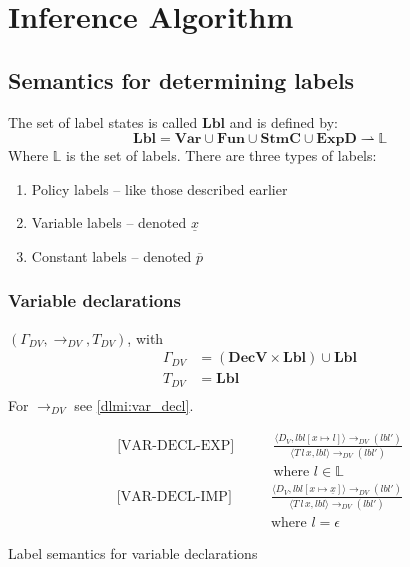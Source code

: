 
\newcommand{\iVar}{\mathbf{Var}}
\newcommand{\iFun}{\mathbf{Fun}}
\newcommand{\iDecv}{\mathbf{DecV}}
\newcommand{\iDecf}{\mathbf{DecF}}
\newcommand{\iStmc}{\mathbf{StmC}}
\newcommand{\iExpd}{\mathbf{ExpD}}
\newcommand{\iLbl}{\mathbf{Lbl}}

\newcommand{\trtspc}{\hspace{2em}} %

\section{Inference Algorithm}

\subsection{Semantics for determining labels}
The set of label states is called $\iLbl$ and is defined by:
\[
  \iLbl = \iVar \cup \iFun \cup \iStmc \cup \iExpd \rightharpoonup \mathbb{L}
\]
Where $\mathbb{L}$ is the set of labels.
There are three types of labels:
\begin{enumerate}
  \item Policy labels -- like those described earlier
  \item Variable labels -- denoted $\underline{x}$
  \item Constant labels -- denoted $\overline{p}$
\end{enumerate}

\subsubsection{Variable declarations}
$(\Gamma_{DV}, \rightarrow_{DV}, T_{DV})$, with
\begin{align*}
  \Gamma_{DV} & = (\iDecv \times \iLbl) \cup \iLbl \\
  T_{DV} & = \iLbl \\
\end{align*}
For $\rightarrow_{DV}$ see \cref{dlmi:var_decl}.

\begin{table}
\begin{align*}
  \text{[VAR-DECL-EXP]} \trtspc & \frac{
    \langle D_V, lbl[x \mapsto l] \rangle \rightarrow_{DV} (lbl')
  }{
    \langle T \, l \, x, lbl \rangle \rightarrow_{DV} (lbl')
  }\\
  & \text{where } l \in \mathbb{L}
\end{align*}
\begin{align*}
  \text{[VAR-DECL-IMP]} \trtspc & \frac{
    \langle D_V, lbl[x \mapsto \underline{x}] \rangle \rightarrow_{DV} (lbl')
  }{
    \langle T \, l \, x, lbl \rangle \rightarrow_{DV} (lbl')
  }\\
  & \text{where } l = \epsilon
\end{align*}
\caption{Label semantics for variable declarations}
\label{dlmi:var_decl}
\end{table}

